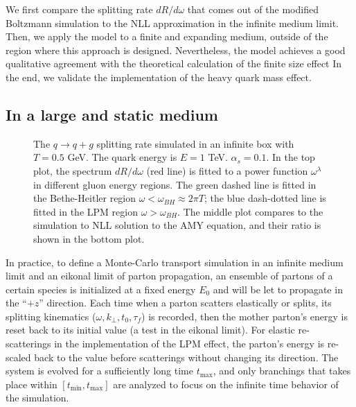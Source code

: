 We first compare the splitting rate $dR/d\omega$ that comes out of the modified Boltzmann simulation to the NLL approximation in the infinite medium limit.
Then, we apply the model to a finite and expanding medium, outside of the region where this approach is designed.
Nevertheless, the model achieves a good qualitative agreement with the theoretical calculation of the finite size effect
In the end, we validate the implementation of the heavy quark mass effect.

\subsection{In a large and static medium}
\begin{figure}
\singlespacing
{}
\caption[The $q\rightarrow q+g$ splitting rate simulated in an infinite box with]{The $q\rightarrow q+g$ splitting rate simulated in an infinite box with $T=0.5$ GeV. The quark energy is $E=1$ TeV. $\alpha_s = 0.1$. In the top plot, the spectrum $dR/d\omega$ (red line) is fitted to a power function $\omega^\lambda$ in different gluon energy regions. The green dashed line is fitted in the Bethe-Heitler region $\omega < \omega_{BH}\approx 2\pi T$; the blue dash-dotted line is fitted in the LPM region $\omega > \omega_{BH}$. The middle plot compares to the simulation to NLL solution to the AMY equation, and their ratio is shown in the bottom plot.}
\label{fig:spectrum}
\end{figure}

In practice, to define a Monte-Carlo transport simulation in an infinite medium limit and an eikonal limit of parton propagation, an ensemble of partons of a certain species is initialized at a fixed energy $E_0$ and will be let to propagate in the ``$+z$'' direction.
Each time when a parton scatters elastically or splits, its splitting kinematics ($\omega, k_\perp, t_0, \tau_f$) is recorded, then the mother parton's energy is reset back to its initial value (a test in the eikonal limit).
For elastic re-scatterings in the implementation of the LPM effect, the parton's energy is re-scaled back to the value before scatterings without changing its direction.
The system is evolved for a sufficiently long time $t_{\max}$, and only branchings that takes place within $[t_{\min}, t_{\max}]$ are analyzed to focus on the infinite time behavior of the simulation.

